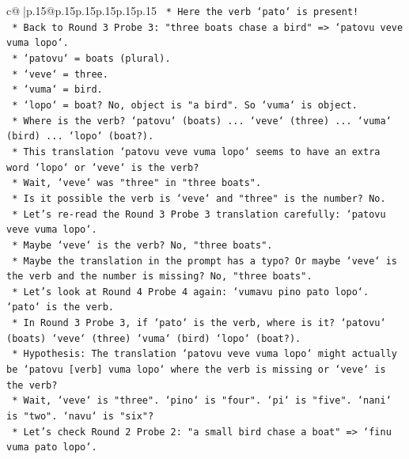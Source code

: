 \documentclass{article}
\begin{document}
{\begin{supertabular}{c@{$\;$}|p{.15\linewidth}@{}p{.15\linewidth}p{.15\linewidth}p{.15\linewidth}p{.15\linewidth}p{.15\linewidth}}
{{{\texttt{                    *   Here the verb `pato` is present!} \\
\texttt{                *   Back to Round 3 Probe 3: "three boats chase a bird" => `patovu veve vuma lopo`.} \\
\texttt{                    *   `patovu` = boats (plural).} \\
\texttt{                    *   `veve` = three.} \\
\texttt{                    *   `vuma` = bird.} \\
\texttt{                    *   `lopo` = boat? No, object is "a bird". So `vuma` is object.} \\
\texttt{                    *   Where is the verb? `patovu` (boats) ... `veve` (three) ... `vuma` (bird) ... `lopo` (boat?).} \\
\texttt{                    *   This translation `patovu veve vuma lopo` seems to have an extra word `lopo` or `veve` is the verb?} \\
\texttt{                    *   Wait, `veve` was "three" in "three boats".} \\
\texttt{                    *   Is it possible the verb is `veve` and "three" is the number? No.} \\
\texttt{                    *   Let's re{-}read the Round 3 Probe 3 translation carefully: `patovu veve vuma lopo`.} \\
\texttt{                    *   Maybe `veve` is the verb? No, "three boats".} \\
\texttt{                    *   Maybe the translation in the prompt has a typo? Or maybe `veve` is the verb and the number is missing? No, "three boats".} \\
\texttt{                    *   Let's look at Round 4 Probe 4 again: `vumavu pino pato lopo`. `pato` is the verb.} \\
\texttt{                    *   In Round 3 Probe 3, if `pato` is the verb, where is it? `patovu` (boats) `veve` (three) `vuma` (bird) `lopo` (boat?).} \\
\texttt{                    *   Hypothesis: The translation `patovu veve vuma lopo` might actually be `patovu {[}verb{]} vuma lopo` where the verb is missing or `veve` is the verb?} \\
\texttt{                    *   Wait, `veve` is "three". `pino` is "four". `pi` is "five". `nani` is "two". `navu` is "six"?} \\
\texttt{                    *   Let's check Round 2 Probe 2: "a small bird chase a boat" => `finu vuma pato lopo`.} \\
}}}
\end{supertabular}}
\end{document}

